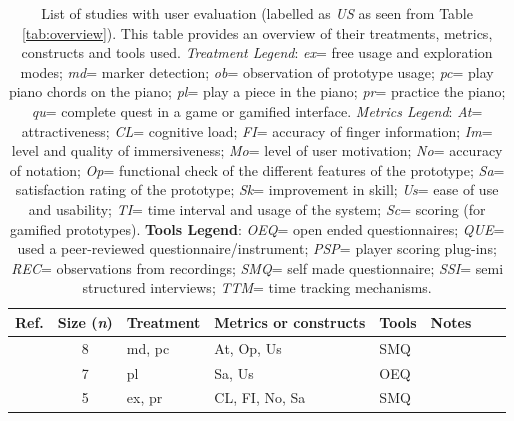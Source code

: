 \documentclass[sigchi, review]{acmart}
\begin{document}
\begin{table}[t]
\caption{List of studies with user evaluation (labelled as \textit{US} as seen from Table \ref{tab:overview}). This table provides an overview of their treatments, metrics, constructs and tools used. \textit{Treatment Legend}: \textit{ex}= free usage and exploration modes; \textit{md}= marker detection; \textit{ob}= observation of prototype usage; \textit{pc}= play piano chords on the piano;  \textit{pl}= play a piece in the piano; \textit{pr}= practice the piano; \textit{qu}= complete quest in a game or gamified interface.  \textit{Metrics Legend}:   \textit{At}= attractiveness; \textit{CL}= cognitive load; \textit{FI}= accuracy of finger information; \textit{Im}= level and quality of immersiveness; \textit{Mo}= level of user motivation; \textit{No}= accuracy of notation; \textit{Op}= functional check of the different features of the prototype; \textit{Sa}= satisfaction rating of the prototype; \textit{Sk}= improvement in skill; \textit{Us}= ease of use and usability; \textit{TI}= time interval and usage of the system; \textit{Sc}= scoring (for gamified prototypes). \textbf{Tools Legend}: \textit{OEQ}= open ended questionnaires; \textit{QUE}= used a peer-reviewed questionnaire/instrument; \textit{PSP}= player scoring plug-ins; \textit{REC}= observations from recordings; \textit{SMQ}= self made questionnaire; \textit{SSI}= semi structured interviews; \textit{TTM}= time tracking mechanisms. }
\label{tab: us-all}
\small\begin{tabularx}{\textwidth}{lclllllX} \toprule
\textbf{Ref.}                           & \textbf{Size} (\textit{n})    & \textbf{Treatment}    & \textbf{Metrics or constructs}    & \textbf{Tools} & \textbf{Notes }\\ \midrule
\cite{nugraha2014pemanfaatan}        & 8            & md, pc      & At, Op, Us             & SMQ                   & \\ \hline
\cite{chow2013music}                 & 7            & pl          & Sa, Us                 & OEQ                   & \\ \hline
\cite{weing2013piano}                & 5            & ex, pr      & CL, FI, No, Sa         & SMQ                   & \\ \hline

\end{tabularx}
\end{table}
\end{document}
